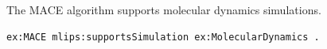 The MACE algorithm supports molecular dynamics simulations.
\begin{lstlisting}[language=turtle]
ex:MACE mlips:supportsSimulation ex:MolecularDynamics .
\end{lstlisting}
